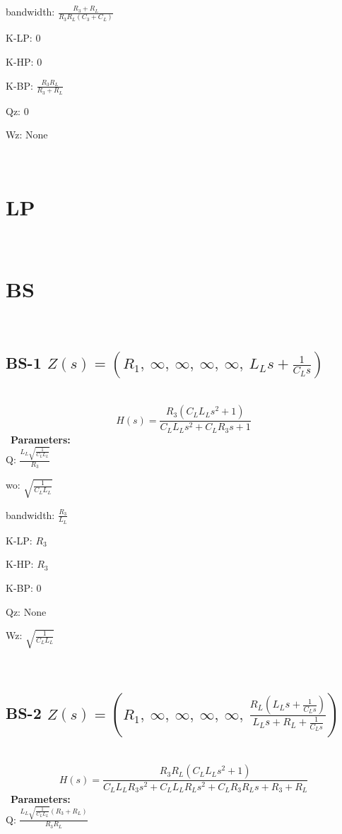 \documentclass{article}
\begin{document}
bandwidth: $\frac{R_{3} + R_{L}}{R_{3} R_{L} \left(C_{3} + C_{L}\right)}$\ 

K-LP: $0$\ 

K-HP: $0$\ 

K-BP: $\frac{R_{3} R_{L}}{R_{3} + R_{L}}$\ 

Qz: $0$\ 

Wz: $\text{None}$\ 

\ 

\section{LP}\ 
\section{BS}\ 
\subsection{BS-1 $Z(s) = \left( R_{1}, \  \infty, \  \infty, \  \infty, \  \infty, \  L_{L} s + \frac{1}{C_{L} s}\right)$ } \ 
\textbf{\[H(s) = \frac{R_{3} \left(C_{L} L_{L} s^{2} + 1\right)}{C_{L} L_{L} s^{2} + C_{L} R_{3} s + 1}\] } \ 
\textbf{Parameters:}\\ 

Q: $\frac{L_{L} \sqrt{\frac{1}{C_{L} L_{L}}}}{R_{3}}$\ 

wo: $\sqrt{\frac{1}{C_{L} L_{L}}}$\ 

bandwidth: $\frac{R_{3}}{L_{L}}$\ 

K-LP: $R_{3}$\ 

K-HP: $R_{3}$\ 

K-BP: $0$\ 

Qz: $\text{None}$\ 

Wz: $\sqrt{\frac{1}{C_{L} L_{L}}}$\ 

\ 

\subsection{BS-2 $Z(s) = \left( R_{1}, \  \infty, \  \infty, \  \infty, \  \infty, \  \frac{R_{L} \left(L_{L} s + \frac{1}{C_{L} s}\right)}{L_{L} s + R_{L} + \frac{1}{C_{L} s}}\right)$ } \ 
\textbf{\[H(s) = \frac{R_{3} R_{L} \left(C_{L} L_{L} s^{2} + 1\right)}{C_{L} L_{L} R_{3} s^{2} + C_{L} L_{L} R_{L} s^{2} + C_{L} R_{3} R_{L} s + R_{3} + R_{L}}\] } \ 
\textbf{Parameters:}\\ 

Q: $\frac{L_{L} \sqrt{\frac{1}{C_{L} L_{L}}} \left(R_{3} + R_{L}\right)}{R_{3} R_{L}}$\ 
\end{document}
